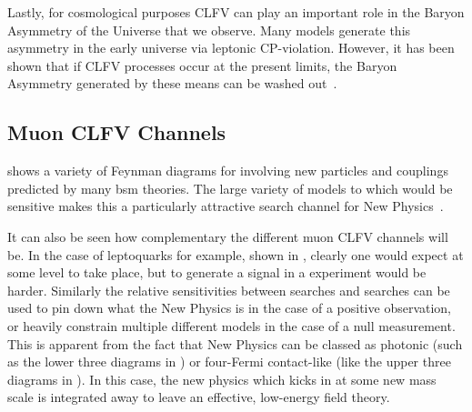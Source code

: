 Lastly, for cosmological purposes \ac{CLFV} can play an important role in the Baryon Asymmetry of the Universe that we observe.
Many models generate this asymmetry in the early universe via leptonic CP-violation.
However, it has been shown that if \ac{CLFV} processes occur at the present limits, the Baryon Asymmetry generated by these means can be washed out~\cite{}.

\subsection{Muon CLFV Channels}
\FigTheoryMuEConvNewPhysics
{} shows a variety of Feynman diagrams for \mueconv involving new particles and couplings predicted by many \ac{bsm} theories.
The large variety of models to which \mueconv would be sensitive makes this a particularly attractive search channel for New Physics~\cite{Altmannshofer2009ne}.

It can also be seen how complementary the different muon CLFV channels will be.
In the case of leptoquarks for example, shown in , clearly one would expect at some level \mueconv to take place, but to generate a signal in a \muThreeE experiment would be harder.
Similarly the relative sensitivities between \mueg searches and \mueconv searches can be used to pin down what the New Physics is in the case of a positive observation, or heavily constrain multiple different models in the case of a null measurement.
This is apparent from the fact that New Physics can be classed as photonic (such as the lower three diagrams in ) or four-Fermi contact-like (like the upper three diagrams in ).
In this case, the new physics which kicks in at some new mass scale is integrated away to leave an effective, low-energy field theory.

